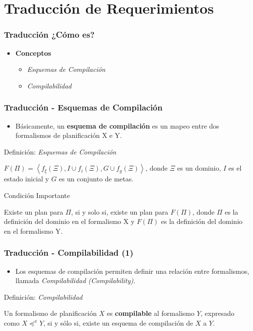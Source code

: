 \documentclass[bigger]{beamer}
\begin{document}
\section{Traducción de Requerimientos}
\label{sec-5}
\begin{frame}[<+->]
\frametitle{Traducción ¿Cómo es?}
\label{sec-5.1}
\begin{itemize}

\item \textbf{Conceptos}
\label{sec-5.1.1}%
\begin{itemize}

\item \emph{Esquemas de Compilación}\\
\label{sec-5.1.1.1}%
\item \emph{Compilabilidad}\\
\label{sec-5.1.1.2}%
\end{itemize} %
\end{itemize} %
\end{frame}
\begin{frame}[<+->]
\frametitle{Traducción - Esquemas de Compilación}
\label{sec-5.2}
\begin{itemize}

\item Básicamente, un \textbf{esquema de compilación} es un mapeo entre dos formalismos de planificación X e Y.\\
\label{sec-5.2.1}%
\end{itemize} %
\begin{block}{Definición: \emph{Esquemas de Compilación}}
\label{sec-5.2.2}

$F(\Pi) = \left\langle f_{\xi}(\Xi),I \cup f_{i}(\Xi),G \cup
f_{g}(\Xi) \right\rangle$, donde $\Xi$ es un dominio, $I$ es el estado
inicial y $G$ es un conjunto de metas.
\end{block}
\begin{block}{Condición Importante}
\label{sec-5.2.3}

Existe un plan para $\Pi$, si y solo si, existe un plan para $F(\Pi)$,
donde $\Pi$ es la definición del dominio en el formalismo X y $F(\Pi)$
es la definición del dominio en el formalismo Y.
\end{block}
\end{frame}
\begin{frame}[<+->]
\frametitle{Traducción - Compilabilidad (1)}
\label{sec-5.3}
\begin{itemize}

\item Los esquemas de compilación permiten definir una relación entre formalismos, llamada \emph{Compilabilidad (Compilability)}.\\
\label{sec-5.3.1}%
\end{itemize} %
\begin{block}{Definición: \emph{Compilabilidad}}
\label{sec-5.3.2}

        Un formalismo de planificaci\'on $X$ es {\bf compilable} al formalismo 
        $Y$, expresado como $X \preccurlyeq^{x} Y$, si y s\'olo si,
        existe un esquema de compilaci\'on de $X$ a $Y$.
\end{block}
\end{frame}
\end{document}
